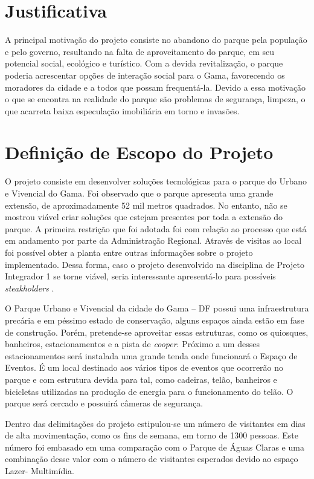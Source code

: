 \section{Justificativa}

A principal motiva\c{c}\~ao do projeto consiste no abandono do parque pela popula\c{c}\~ao e pelo governo, resultando na falta de aproveitamento do parque, em seu potencial social, ecológico e turístico. Com a devida revitaliza\c{c}\~ao, o parque poderia acrescentar op\c{c}\~oes de intera\c{c}\~ao social para o Gama, favorecendo os moradores da cidade e a todos que possam frequent\'a-la.
Devido a essa motiva\c{c}\~ao o que se encontra na realidade do parque s\~ao problemas de seguran\c{c}a, limpeza, o que acarreta baixa especula\c{c}\~ao imobili\'aria em torno e invas\~oes. 

\section{Definição de Escopo do Projeto}

	O projeto consiste em desenvolver soluções tecnológicas para o parque do Urbano e Vivencial do Gama. Foi observado que o parque apresenta uma grande extensão, de aproximadamente 52 mil metros quadrados. No entanto, não se mostrou viável criar soluções que estejam presentes por toda a extensão do parque. A primeira restrição que foi adotada foi com relação ao processo que está em andamento por parte da Administração Regional. Através de visitas ao local foi possível obter a planta entre outras informações sobre o projeto implementado. Dessa forma, caso o projeto desenvolvido na disciplina de Projeto Integrador 1 se torne viável, seria interessante apresentá-lo para possíveis \textit{steakholders} .
	
	O Parque Urbano e Vivencial da cidade do Gama – DF possui uma infraestrutura precária e em péssimo estado de conservação, alguns espaços ainda estão em fase de construção. Porém, pretende-se aproveitar essas estruturas, como os quiosques, banheiros, estacionamentos e a pista de \textit{cooper}. Próximo a um desses estacionamentos será instalada uma grande tenda onde funcionará o Espaço de Eventos. É um local destinado aos vários tipos de eventos que ocorrerão no parque e com estrutura devida para tal, como cadeiras, telão, banheiros e bicicletas utilizadas na produção de energia para o funcionamento do telão. O parque será cercado e possuirá câmeras de segurança.
	
	Dentro das delimitações do projeto estipulou-se um número de visitantes em dias de alta movimentação, como os fins de semana, em torno de 1300 pessoas. Este número foi embasado em uma comparação com o Parque de Águas Claras e uma combinação desse valor com o número de visitantes esperados devido ao espaço Lazer- Multimídia.
	
